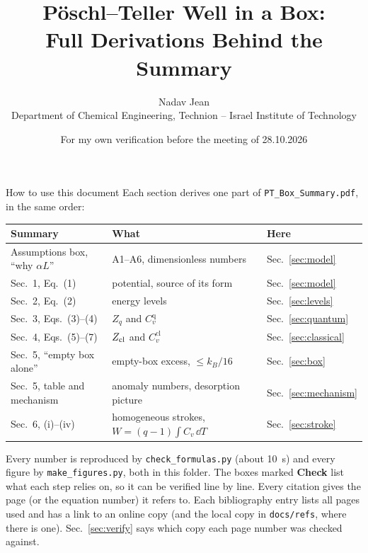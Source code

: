 \documentclass[11pt]{article}
\title{P\"oschl--Teller Well in a Box:\\Full Derivations Behind the Summary}
\author{Nadav Jean\\[1mm]
\small Department of Chemical Engineering, Technion -- Israel Institute of Technology}
\date{\small For my own verification before the meeting of 28.10.2026}
\numberwithin{equation}{section}
\newcommand{\Cq}{C_v^{\mathrm{q}}}
\newcommand{\Ccl}{C_v^{\mathrm{cl}}}
\newcommand{\kB}{k_{B}}
\begin{document}
\maketitle
\thispagestyle{fancy}

\begin{resultbox}{How to use this document}
Each section derives one part of \texttt{PT\_Box\_Summary.pdf}, in the same order:
\begin{center}
\begin{tabular}{lll}
\toprule
Summary & What & Here\\
\midrule
Assumptions box, ``why $\alpha L$'' & A1--A6, dimensionless numbers & Sec.~\ref{sec:model}\\
Sec.~1, Eq.~(1) & potential, source of its form & Sec.~\ref{sec:model}\\
Sec.~2, Eq.~(2) & energy levels & Sec.~\ref{sec:levels}\\
Sec.~3, Eqs.~(3)--(4) & $Z_q$ and $\Cq$ & Sec.~\ref{sec:quantum}\\
Sec.~4, Eqs.~(5)--(7) & $Z_{\rm cl}$ and $\Ccl$ & Sec.~\ref{sec:classical}\\
Sec.~5, ``empty box alone'' & empty-box excess, $\le\kB/16$ & Sec.~\ref{sec:box}\\
Sec.~5, table and mechanism & anomaly numbers, desorption picture & Sec.~\ref{sec:mechanism}\\
Sec.~6, (i)--(iv) & homogeneous strokes, $W=(q-1)\int C_v\,\dd T$ & Sec.~\ref{sec:stroke}\\
\bottomrule
\end{tabular}
\end{center}
Every number is reproduced by \texttt{check\_formulas.py} (about 10~s) and every figure by \texttt{make\_figures.py}, both in this folder. The boxes marked \textbf{Check} list what each step relies on, so it can be verified line by line. Every citation gives the page (or the equation number) it refers to. Each bibliography entry lists all pages used and has a link to an online copy (and the local copy in \texttt{docs/refs}, where there is one). Sec.~\ref{sec:verify} says which copy each page number was checked against.
\end{resultbox}

\tableofcontents

\end{document}
